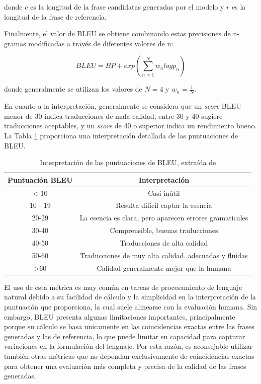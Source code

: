 \documentclass[11pt,spanish,listoffigures,listoftables]{tfgetsinf}
\begin{document}
donde $c$ es la longitud de la frase candidatas generadas por el modelo y $r$ es la longitud de la frase de referencia.

Finalmente, el valor de BLEU se obtiene combinando estas precisiones de n-gramas modificadas a través de diferentes valores de n:

\begin{equation}
BLEU = BP + exp(\sum_{n = 1}^N w_n log p_n)
\end{equation}

donde generalmente se utilizan los valores de $N = 4$ y $w_n = \frac{1}{N}$.

En cuanto a la interpretación, generalmente se considera que un \textit{score} BLEU menor de 30 indica traducciones de mala calidad, entre 30 y 40 sugiere traducciones aceptables, y un \textit{score} de 40 o superior indica un rendimiento bueno. La Tabla \ref{tab: bleu} proporciona una  interpretación detallada de las puntuaciones de BLEU.

\begin{table}[!h]
\caption{Interpretación de las puntuaciones de BLEU, extraída de \cite{googleTranslate}}
\begin{center}
\begin{tabular}{  c | c  }
	Puntuación BLEU & Interpretación \\
	\hline
	< 10 & Casi inútil \\
	10 - 19 & Resulta difícil captar la esencia \\
	20-29 & La esencia es clara, pero aparecen errores gramaticales \\
	30-40 & Comprensible, buenas traducciones \\
	40-50 & Traducciones de alta calidad \\
	50-60 & Traducciones de muy alta calidad. adecuadas y fluidas \\
	>60 & Calidad generalmente mejor que la humana
\end{tabular}
\end{center}
\label{tab: bleu}
\end{table}

El uso de esta métrica es muy común en tareas de procesamiento de lenguaje natural debido a su facilidad de cálculo y la simplicidad en la interpretación de la puntuación que proporciona, la cual suele alinearse con la evaluación humana. Sin embargo, BLEU presenta algunas limitaciones importantes, principalmente porque su cálculo se basa unicamente en las coincidencias exactas entre las frases generadas y las de referencia, lo que puede limitar su capacidad para capturar variaciones en la formulación del lenguaje. Por esta razón, es aconsejable utilizar también otras métricas que no dependan exclusivamente de coincidencias exactas para obtener una evaluación más completa y precisa de la calidad de las frases generadas.
\end{document}
